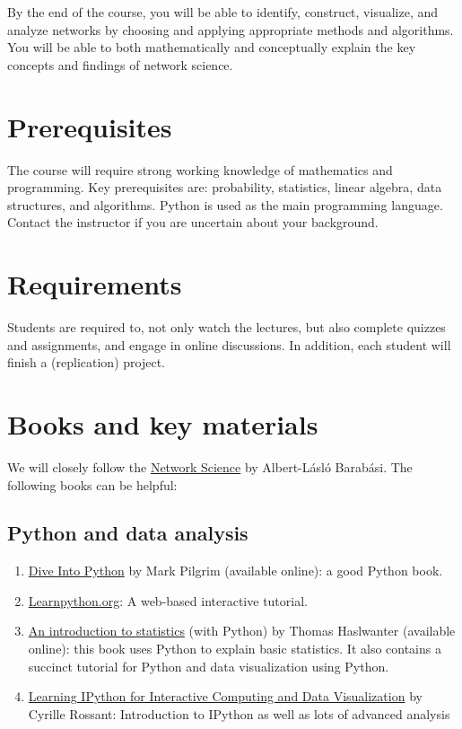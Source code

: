 \documentclass[11pt,article,oneside]{memoir}
\begin{document}
By the end of the course, you will be able to identify, construct, visualize,
and analyze networks by choosing and applying appropriate methods and
algorithms. You will be able to both mathematically and conceptually explain
the key concepts and findings of network science. 

\section{Prerequisites}
\label{sec:Prerequisites}

The course will require strong working knowledge of mathematics and
programming. Key prerequisites are: probability, statistics, linear algebra,
data structures, and algorithms. Python is used as the main programming
language.  Contact the instructor if you are uncertain about your background. 

\section{Requirements}
\label{sec:requirements}

Students are required to, not only watch the lectures, but also complete
quizzes and assignments, and engage in online discussions. In addition, each
student will finish a (replication) project. 

\section{Books and key materials}

We will closely follow the
\href{http://barabasi.com/networksciencebook/}{Network Science} by Albert-Lásló
Barabási. The following books can be helpful:

\subsection{Python and data analysis}

\begin{enumerate}

\item \href{http://www.diveintopython3.net/index.html}{Dive Into Python} by Mark Pilgrim (available online): a good Python book. 

\item \href{http://www.learnpython.org}{Learnpython.org}: A web-based interactive tutorial. 

\item \href{http://work.thaslwanter.at/Stats/html/}{An introduction to statistics} (with Python) by Thomas Haslwanter (available online): this book uses Python to explain basic statistics. It also contains a succinct tutorial for Python and data visualization using Python. 

\item \href{http://ipython.rossant.net}{Learning IPython for Interactive Computing and Data Visualization} by  Cyrille Rossant: Introduction to IPython as well as lots of advanced analysis 


\end{enumerate}
\end{document}
